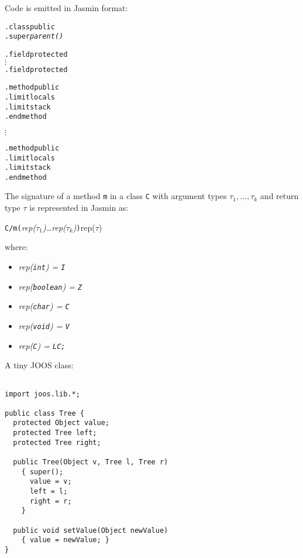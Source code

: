 \begin{slide*}
Code is emitted in Jasmin format:

\newcommand{\VV}{$\vdots$}
\begin{scriptsize}
\begin{alltt}

    .class public 
    .super{\em parent()}
    
    .field protected 
    \VV{}
    .field protected 

    .method public 
       .limit locals 
       .limit stack 
    .end method

    \VV{}

    .method public 
       .limit locals 
       .limit stack 
    .end method
\end{alltt}
\end{scriptsize}

\vfil
\end{slide*}

\begin{slide*}
The signature of a method {\tt m} in a class {\tt C} with
argument types $\tau_1,\ldots,\tau_k$ and return type $\tau$
is represented in Jasmin as:
\begin{center}
{\tt C/m(}{\em {\small rep}($\tau_1$)\ldots {\small rep}($\tau_k$)}{\tt )}{\small rep}($\tau$) 
\end{center}
where:
\begin{itemize}
\item {\em {\small rep}({\tt int}) = {\tt I}}
\item {\em {\small rep}({\tt boolean}) = {\tt Z}}
\item {\em {\small rep}({\tt char}) = {\tt C}}
\item {\em {\small rep}({\tt void}) = {\tt V}}
\item {\em {\small rep}({\tt C}) = {\tt LC;}}
\end{itemize}
\vfil
\end{slide*}
 
\begin{slide*}
A tiny JOOS class:

\begin{scriptsize}
\begin{verbatim}

import joos.lib.*;
 
public class Tree {
  protected Object value;
  protected Tree left;
  protected Tree right;
 
  public Tree(Object v, Tree l, Tree r)
    { super();
      value = v;
      left = l; 
      right = r;
    }
 
  public void setValue(Object newValue)
    { value = newValue; }
}
\end{verbatim}
\end{scriptsize}

\vfil
\end{slide*}
 
